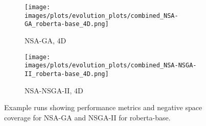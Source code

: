 \begin{figure}[htbp]
    \vspace{0.2cm}
    \begin{subfigure}[b]{0.40\textwidth}
        \texttt{[image: images/plots/evolution\_plots/combined\_NSA-GA\_roberta-base\_4D.png]}
        \caption{\scriptsize NSA-GA, 4D}
        \label{subfig:roberta-base_NSA-GA_4D}
        \end{subfigure}\hspace{0.05\textwidth}
    \begin{subfigure}[b]{0.40\textwidth}
        \texttt{[image: images/plots/evolution\_plots/combined\_NSA-NSGA-II\_roberta-base\_4D.png]}
        \caption{\scriptsize NSA-NSGA-II, 4D}
        \label{subfig:roberta-base_NSA-NSGA-II_4D}
        \end{subfigure}
    \caption{\small Example runs showing performance metrics and negative space coverage for NSA-GA and NSGA-II for roberta-base.}
        \label{fig:evolution_plots_roberta-base}
        \end{figure}
        